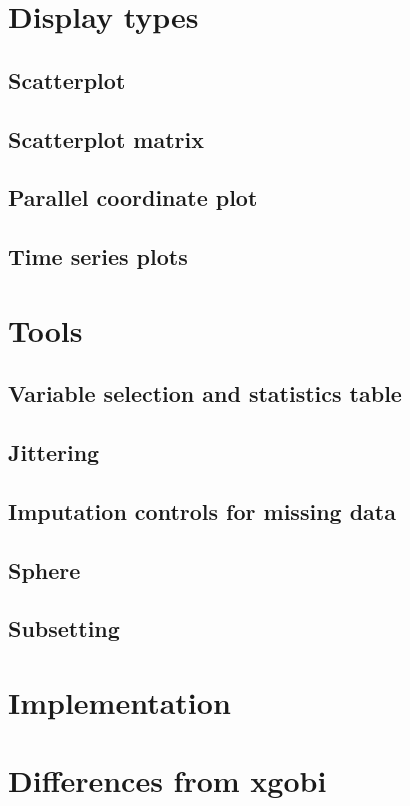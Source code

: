 \documentclass[11pt]{article}
\begin{document}
\section {Display types}
\subsection{Scatterplot}
\subsection{Scatterplot matrix}
\subsection{Parallel coordinate plot}
\subsection{Time series plots}

\newpage
\section{Tools}
\subsection{Variable selection and statistics table}
\label{slbl:VarStats}
\subsection{Jittering}
\subsection{Imputation controls for missing data}
\subsection{Sphere}
\label{slbl:Sphere}
\subsection{Subsetting}

\section{Implementation}

\section{Differences from xgobi}
\label{slbl:xgobi}
\end{document}
